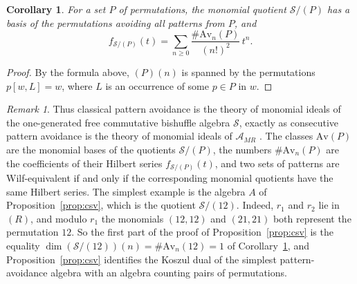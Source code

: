 \documentclass[11pt]{amsart}
\newtheorem{corollary}[theorem]{Corollary}
\theoremstyle{definition}
\theoremstyle{remark}
\newtheorem{remark}[theorem]{Remark}
\newcommand{\cA}{\mathscr{A}}
\newcommand{\AMR}{\cA_{MR}}
\newcommand{\cS}{\mathscr{S}}
\newcommand{\Av}{\mathrm{Av}}
\begin{document}
\begin{corollary}\label{cor:classical}
For a set $P$ of permutations, the monomial quotient $\cS/(P)$ has a basis of the permutations avoiding all patterns from $P$, and
\[
f_{\cS/(P)}(t)=\sum_{n\ge0}\frac{\#\Av_n(P)}{(n!)^2}\,t^n .
\]
\end{corollary}

\begin{proof}
By the formula above, $(P)(n)$ is spanned by the permutations $p[w,L]=w$, where $L$ is an occurrence of some $p\in P$ in $w$.
\end{proof}

\begin{remark}\label{rem:patterns}
Thus classical pattern avoidance is the theory of monomial ideals of the one-generated free commutative bishuffle algebra $\cS$, exactly as consecutive pattern avoidance is the theory of monomial ideals of $\AMR$ \cite{DK}. The classes $\Av(P)$ are the monomial bases of the quotients $\cS/(P)$, the numbers $\#\Av_n(P)$ are the coefficients of their Hilbert series $f_{\cS/(P)}(t)$, and two sets of patterns are Wilf-equivalent if and only if the corresponding monomial quotients have the same Hilbert series. The simplest example is the algebra $A$ of Proposition~\ref{prop:csv}, which is the quotient $\cS/(12)$. Indeed, $r_1$ and $r_2$ lie in $(R)$, and modulo $r_1$ the monomials $(12,12)$ and $(21,21)$ both represent the permutation $12$. So the first part of the proof of Proposition~\ref{prop:csv} is the equality $\dim(\cS/(12))(n)=\#\Av_n(12)=1$ of Corollary~\ref{cor:classical}, and Proposition~\ref{prop:csv} identifies the Koszul dual of the simplest pattern-avoidance algebra with an algebra counting pairs of permutations.
\end{remark}
\end{document}
